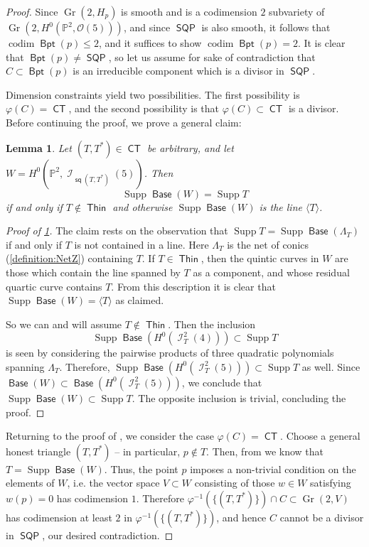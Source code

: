 \documentclass[reqno, 11pt]{amsart}
\theoremstyle{plain}
\newtheorem{lemma}[theorem]{Lemma}
\theoremstyle{remark}
\renewcommand{\P}{\mathbb{P}}
\DeclareMathOperator{\I}{\mathcal{I}}
\renewcommand{\O}{\mathcal{O}}
\DeclareMathOperator{\CT}{\mathsf{CT}}
\DeclareMathOperator{\Thin}{\mathsf{Thin}}
\DeclareMathOperator{\SQP}{\mathsf{SQP}}
\DeclareMathOperator{\Gr}{Gr}
\DeclareMathOperator{\s}{\mathsf{sq}}
\DeclareMathOperator{\BP}{\mathsf{Bpt}}
\DeclareMathOperator{\Base}{\mathsf{Base}}
\DeclareMathOperator{\codim}{codim}
\DeclareMathOperator{\Supp}{Supp}
\begin{document}
\begin{proof}
    Since $\Gr(2,H_{p})$ is smooth and is a codimension $2$ subvariety of $\Gr\left(2, H^{0}(\P^{2}, \O(5))\right)$, and since $\SQP$ is also smooth, it follows that $\codim \BP(p) \leq 2$, and it suffices to show $\codim \BP(p) = 2$. It is clear that $\BP (p) \neq \SQP$, so let us assume for sake of contradiction that $C \subset \BP(p)$ is an irreducible component which is a divisor in $\SQP$.  

    Dimension constraints yield two possibilities. The first possibility is $\varphi(C) = \CT$, and the second possibility is that $\varphi(C) \subset \CT$ is a divisor.  Before continuing the proof, we prove a general claim:  
    \begin{lemma}
    \label{claim:support}
    Let $(T,T^{*}) \in \CT$ be arbitrary, and let $W = H^{0}(\P^{2}, \I_{\s(T,T^{*})}(5))$.  Then \[\Supp \Base(W) = \Supp T\] if and only if $T \notin \Thin$ and otherwise $\Supp \Base(W)$ is the line $\langle T \rangle$.
    \end{lemma}
    \begin{proof}[Proof of \ref{claim:support}]
    The claim rests on the observation that $\Supp T = \Supp \Base (\Lambda_{T})$ if and only if $T$ is not contained in a line. Here $\Lambda_{T}$ is the net of conics (\autoref{definition:NetZ}) containing $T$.  If $T \in \Thin$, then the quintic curves in $W$ are those which contain the line spanned by $T$ as a component, and whose residual quartic curve contains $T$.  From this description it is clear that $\Supp\Base(W) = \langle T \rangle$ as claimed.  
    
    So we can and will assume $T \notin \Thin$. Then the inclusion $$\Supp \Base (H^{0}(\I_{T}^{2}(4))) \subset \Supp T$$ is seen by considering the pairwise products of  three quadratic polynomials spanning $\Lambda_{T}$.  Therefore, $\Supp \Base (H^{0}(\I_{T}^{2}(5))) \subset \Supp T$ as well. Since $\Base (W) \subset \Base (H^{0}(\I_{T}^{2}(5)))$, we conclude that $\Supp \Base (W) \subset \Supp T$. The opposite inclusion is trivial, concluding the proof. 
    \end{proof}

    Returning to the proof of , we consider the case $\varphi(C) = \CT$.  Choose a general honest triangle $(T,T^{*})$ -- in particular, $p \notin T$.  Then, from  we know that $T = \Supp \Base(W)$.  Thus, the point $p$ imposes a non-trivial condition on the elements of $W$, i.e. the vector space $V \subset W$ consisting of those $w \in W$ satisfying $w(p)=0$ has codimension $1$.  Therefore $\varphi^{-1}(\{(T, T^{*})\}) \cap C \subset \Gr(2,V)$ has codimension at least $2$ in $\varphi^{-1}(\{(T, T^{*})\})$, and hence $C$ cannot be a divisor in $\SQP$, our desired contradiction.  


\end{proof}
\end{document}
